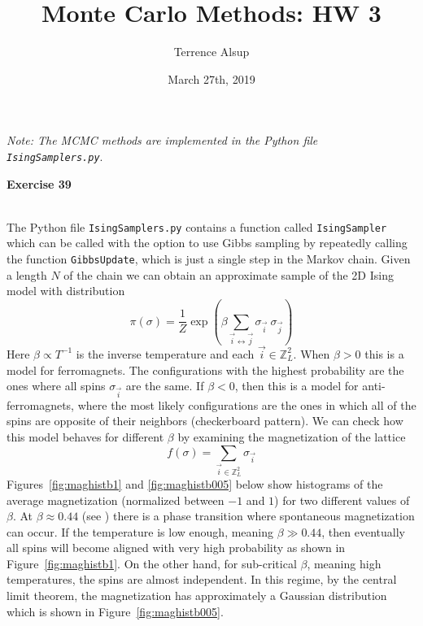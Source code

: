 \documentclass[11pt,a4paper]{amsart}
\begin{document}
\title{Monte Carlo Methods: HW 3}
\author{Terrence Alsup}
\date{March 27th, 2019}
\maketitle

\emph{Note: The MCMC methods are implemented in the Python file {\tt IsingSamplers.py}}.

\vspace{0.5in}


{\bf Exercise 39}\\
\\
\par The Python file {\tt IsingSamplers.py} contains a function called {\tt IsingSampler} which can be called with the option to use Gibbs sampling by repeatedly calling the function {\tt GibbsUpdate}, which is just a single step in the Markov chain.  Given a length $N$ of the chain we can obtain an approximate sample of the 2D Ising model with distribution
\[
\pi(\sigma) = \frac{1}{Z} \exp\left(  \beta \sum_{\vec{i} \leftrightarrow \vec{j}} \sigma_{\vec{i}}\ \sigma_{\vec{j}} \right)
\]
Here $\beta \propto T^{-1}$ is the inverse temperature and each $\vec{i} \in \mathbb{Z}_L^2$.  When $\beta > 0$ this is a model for ferromagnets.  The configurations with the highest probability are the ones where all spins $\sigma_{\vec{i}}$ are the same.  If $\beta < 0$, then this is a model for anti-ferromagnets, where the most likely configurations are the ones in which all of the spins are opposite of their neighbors (checkerboard pattern).  We can check how this model behaves for different $\beta$ by examining the magnetization of the lattice
\[
f(\sigma) = \sum_{\vec{i} \in \mathbb{Z}_L^2} \sigma_{\vec{i}}
\]
Figures~\ref{fig:maghistb1} and \ref{fig:maghistb005} below show histograms of the average magnetization (normalized between $-1$ and $1$) for two different values of $\beta$.  At $\beta \approx 0.44$ (see \cite{IsingWiki}) there is a phase transition where spontaneous magnetization can occur.  If the temperature is low enough, meaning $\beta \gg 0.44$, then eventually all spins will become aligned with very high probability as shown in Figure~\ref{fig:maghistb1}.  On the other hand, for sub-critical $\beta$, meaning high temperatures, the spins are almost independent.  In this regime, by the central limit theorem, the magnetization has approximately a Gaussian distribution which is shown in Figure~\ref{fig:maghistb005}.
\end{document}
